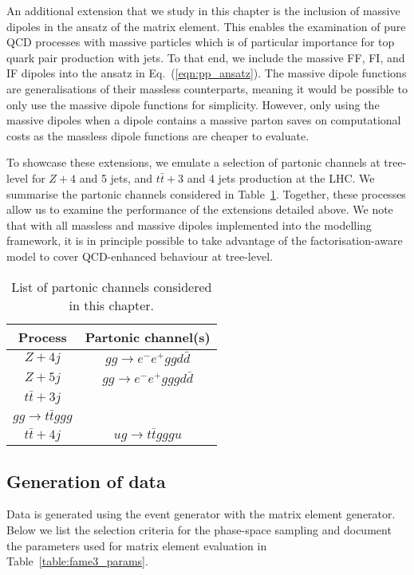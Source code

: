\documentclass[main.tex]{subfiles}
\begin{document}
An additional extension that we study in this chapter is the
inclusion of massive dipoles in the ansatz of the matrix element.
This enables the examination of pure QCD processes with massive
particles which is of particular importance for top quark pair
production with jets. To that end, we include the massive FF, FI,
and IF dipoles into the ansatz in Eq.~(\ref{eqn:pp_ansatz}).
The massive dipole functions are
generalisations of their massless counterparts, meaning it would
be possible to only use the massive dipole functions for simplicity.
However, only using the massive dipoles when a dipole contains a
massive parton saves on computational costs as the massless dipole
functions are cheaper to evaluate.

To showcase these extensions, we emulate a selection of partonic
channels at tree-level for $Z+4$ and 5 jets, and $t\bar{t}+3$ and 4 jets
production at the LHC. We summarise the partonic channels considered
in Table~\ref{table:pp_partonic_channels}.
Together, these processes allow us to examine the performance
of the extensions detailed above.
We note that with all massless and massive dipoles implemented
into the modelling framework, it is in principle possible to
take advantage of the factorisation-aware model to cover
QCD-enhanced behaviour at tree-level.

\begin{table}
    \centering
    \begin{tabular}{cc}
        \toprule
        Process & Partonic channel(s) \\
        \midrule
        $Z+4j$ & $gg \rightarrow e^{-}e^{+}ggd\bar{d}$ \\
        \midrule
        $Z+5j$ & $gg \rightarrow e^{-}e^{+}gggd\bar{d}$ \\
        \midrule
        $t\bar{t}+3j$ & \makecell{$u\bar{u} \rightarrow t\bar{t}gd\bar{d}$ \\ $gg \rightarrow t\bar{t}ggg$} \\
        \midrule
        $t\bar{t}+4j$ & $ug \rightarrow t\bar{t}gggu$ \\
        \bottomrule
    \end{tabular}
    \caption{List of partonic channels considered in this chapter.}
    \label{table:pp_partonic_channels}
\end{table}

\subsection{Generation of data}\label{sec:pp_data}
Data is generated using the {\Sherpa} event generator
with the {\Amegic} matrix element generator.
Below we list the selection criteria for the phase-space sampling and
document the parameters used for matrix element evaluation in Table~\ref{table:fame3_params}.
\end{document}
